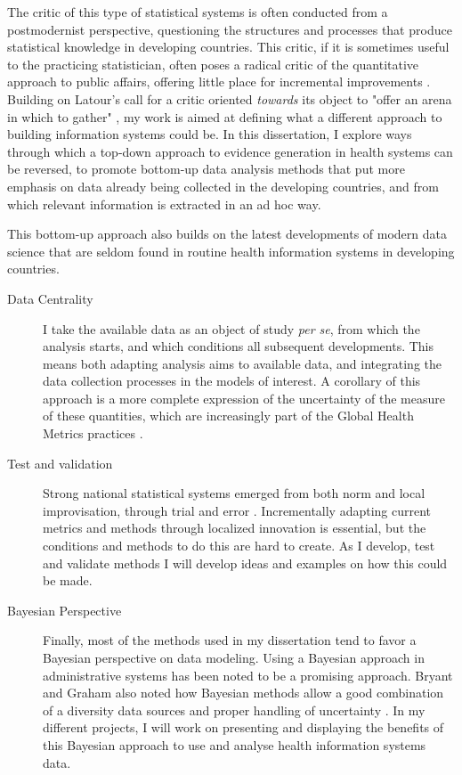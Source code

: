 The critic of this type of statistical systems is often conducted from a postmodernist perspective, questioning the structures and processes that produce statistical knowledge in developing countries. This critic, if it is sometimes useful to the practicing statistician, often poses a radical critic of the quantitative approach to public affairs, offering little place for incremental improvements \citep{rottenburg_world_2016}. Building on Latour's call for a critic oriented \textit{towards} its object to "offer an arena in which to gather" \citep{latour_why_2004}, my work is aimed at defining what a different approach to building information systems could be. In this dissertation, I explore ways through which a top-down approach to evidence generation in health systems can be reversed, to promote  bottom-up data analysis methods that put more emphasis on data already being collected in the developing countries, and from which relevant information is extracted in an ad hoc way.

This bottom-up approach also builds on the latest developments of modern data science that are seldom found in routine health information systems in developing countries.

\begin{description}
\item[Data Centrality] I take the available data as an object of study \textit{per se}, from which the analysis starts, and which conditions all subsequent developments. This means both adapting analysis aims to available data, and integrating the data collection processes in the models of interest. A corollary of this approach is a more complete expression of the uncertainty of the measure of these quantities, which are increasingly part of the Global Health Metrics practices \citep{murray_towards_2007}.
\item[Test and validation] Strong national statistical systems emerged from both norm and local improvisation, through trial and error \citep{lecuyer_medecins_1987,chaperon_information_1988}. Incrementally adapting current metrics and  methods through localized innovation is essential, but the conditions and methods to do this are hard to create. As I develop, test and validate methods I will develop ideas and examples on how this could be made.
\item[Bayesian Perspective] Finally, most of the methods used in my dissertation tend to favor a Bayesian perspective on data modeling. Using a Bayesian approach in administrative systems has been noted to be a promising approach\citep{fienberg_bayesian_2011,little_calibrated_2012}. Bryant and Graham also noted how Bayesian methods allow a good combination of a diversity data sources and proper handling of uncertainty \citep{bryant_bayesian_2013}. In my different projects, I will work on presenting and displaying the benefits of this Bayesian approach to use and analyse health information systems data.
\end{description}



